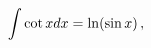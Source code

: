 \[\int\mathop{\cot\/}\nolimits xdx=\mathop{\ln\/}\nolimits\!\left(\mathop{\sin\/%
}\nolimits x\right),\]